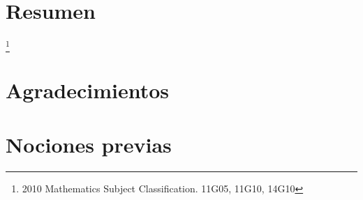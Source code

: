\documentclass[11pt,a4paper,openright,oneside]{article}
\numberwithin{equation}{section}
\theoremstyle{definition}
\begin{document}


\section*{Resumen}
 {\let\thefootnote\relax\footnote{2010 Mathematics Subject Classification. 11G05, 11G10, 14G10}}
\newpage


\section*{Agradecimientos}
\newpage


\tableofcontents
\newpage



\setcounter{page}{1}

\section{Nociones previas}
\end{document}
